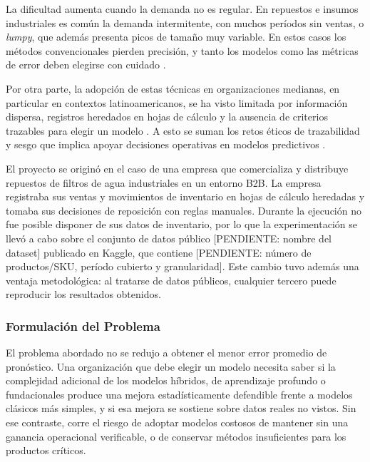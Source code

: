 La dificultad aumenta cuando la demanda no es regular. En repuestos e insumos industriales es común la demanda intermitente, con muchos períodos sin ventas, o \textit{lumpy}, que además presenta picos de tamaño muy variable. En estos casos los métodos convencionales pierden precisión, y tanto los modelos como las métricas de error deben elegirse con cuidado \cite{croston1972,syntetos2005}.

Por otra parte, la adopción de estas técnicas en organizaciones medianas, en particular en contextos latinoamericanos, se ha visto limitada por información dispersa, registros heredados en hojas de cálculo y la ausencia de criterios trazables para elegir un modelo \cite{herbas,babai,ferreira}. A esto se suman los retos éticos de trazabilidad y sesgo que implica apoyar decisiones operativas en modelos predictivos \cite{duarte}.

El proyecto se originó en el caso de una empresa que comercializa y distribuye repuestos de filtros de agua industriales en un entorno B2B. La empresa registraba sus ventas y movimientos de inventario en hojas de cálculo heredadas y tomaba sus decisiones de reposición con reglas manuales. Durante la ejecución no fue posible disponer de sus datos de inventario, por lo que la experimentación se llevó a cabo sobre el conjunto de datos público [PENDIENTE: nombre del dataset] publicado en Kaggle, que contiene [PENDIENTE: número de productos/SKU, período cubierto y granularidad]. Este cambio tuvo además una ventaja metodológica: al tratarse de datos públicos, cualquier tercero puede reproducir los resultados obtenidos.


\subsubsection{Formulación del Problema}
El problema abordado no se redujo a obtener el menor error promedio de pronóstico. Una organización que debe elegir un modelo necesita saber si la complejidad adicional de los modelos híbridos, de aprendizaje profundo o fundacionales produce una mejora estadísticamente defendible frente a modelos clásicos más simples, y si esa mejora se sostiene sobre datos reales no vistos. Sin ese contraste, corre el riesgo de adoptar modelos costosos de mantener sin una ganancia operacional verificable, o de conservar métodos insuficientes para los productos críticos.

